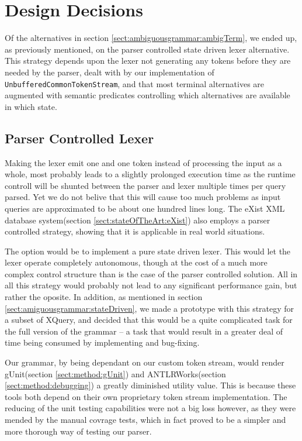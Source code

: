 \section{Design Decisions}
\label{sect:discussion:designDecisions}

Of the alternatives in section \ref{sect:ambiguousgrammar:ambigTerm}, we ended up, as previously mentioned, on the parser controlled state driven lexer alternative. This strategy depends upon the lexer not generating any tokens before they are needed by the parser, dealt with by our implementation of \verb!UnbufferedCommonTokenStream!, and that most terminal alternatives are augmented with semantic predicates controlling which alternatives are available in which state.

\subsection{Parser Controlled Lexer}
Making the lexer emit one and one token instead of processing the input as a whole, most probably leads to a slightly prolonged execution time as the runtime controll will be shunted between the parser and lexer multiple times per query parsed. Yet we do not belive that this will cause too much problems as input queries are approximated to be about one hundred lines long. The eXist XML database system(section \ref{sect:stateOfTheArt:eXist}) also employs a parser controlled strategy, showing that it is applicable in real world situations.

The option would be to implement a pure state driven lexer. This would let the lexer operate completely autonomous, though at the cost of a much more complex control structure than is the case of the parser controlled solution. All in all this strategy would probably not lead to any significant performance gain, but rather the oposite. In addition, as mentioned in section \ref{sect:amiguousgrammar:stateDriven}, we made a prototype with this strategy for a subset of XQuery, and decided that this would be a quite complicated task for the full version of the grammar -- a task that would result in a greater deal of time being consumed by implementing and bug-fixing.

Our grammar, by being dependant on our custom token stream, would render gUnit(section \ref{sect:method:gUnit}) and ANTLRWorks(section \ref{sect:method:debugging}) a greatly diminished utility value. This is because these tools both depend on their own proprietary token stream implementation. The reducing of the unit testing capabilities were not a big loss however, as they were mended by the manual covrage tests, which in fact proved to be a simpler and more thorough way of testing our parser. 

